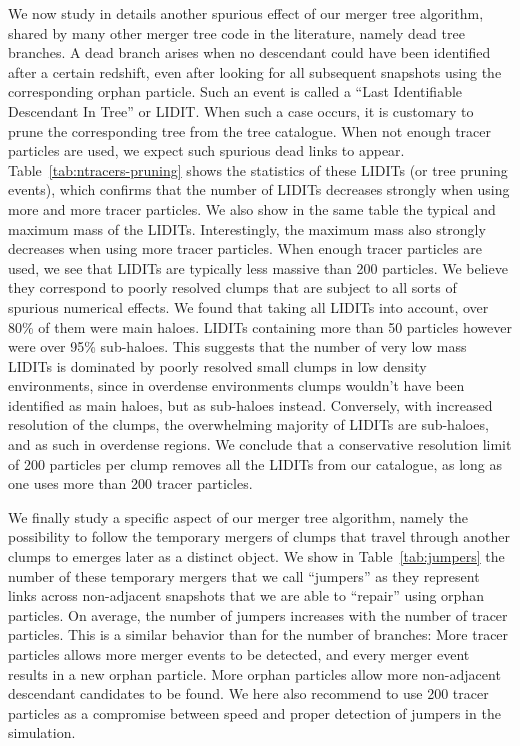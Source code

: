 We now study in details another spurious effect of our merger tree
algorithm, shared by many other merger tree code in the literature,
namely dead tree branches.  A dead branch arises when no descendant
could have been identified after a certain redshift, even after
looking for all subsequent snapshots using the corresponding orphan
particle. Such an event is called a ``Last Identifiable Descendant In
Tree'' or LIDIT.  When such a case occurs, it is customary to prune
the corresponding tree from the tree catalogue. When not enough tracer
particles are used, we expect such spurious dead links to
appear. Table~\ref{tab:ntracers-pruning} shows the statistics of these
LIDITs (or tree pruning events), which confirms that the number of
LIDITs decreases strongly when using more and more tracer
particles. We also show in the same table the typical and maximum mass
of the LIDITs. Interestingly, the maximum mass also strongly decreases
when using more tracer particles. When enough tracer particles are
used, we see that LIDITs are typically less massive than 200
particles. We believe they correspond to poorly resolved clumps that
are subject to all sorts of spurious numerical effects. We found that
taking all LIDITs into account, over 80\% of them were main haloes.
LIDITs containing more than 50 particles however were over 95\% sub-haloes.
This suggests that the number of very low mass LIDITs is dominated
by poorly resolved small clumps in low density environments, since
in overdense environments clumps wouldn't have been identified as main
haloes, but as sub-haloes instead. Conversely, with increased resolution
of the clumps, the overwhelming majority of LIDITs are sub-haloes, and as
such in overdense regions. We conclude that a
conservative resolution limit of 200 particles per clump removes all the
LIDITs from our catalogue, as long as one uses more than 200 tracer
particles.

We finally study a specific aspect of our merger tree algorithm,
namely the possibility to follow the temporary mergers of clumps that
travel through another clumps to emerges later as a distinct object.
We show in Table~\ref{tab:jumpers} the number of these temporary
mergers that we call ``jumpers'' as they represent links across
non-adjacent snapshots that we are able to ``repair'' using orphan
particles. On average, the number of jumpers increases with the
number of tracer particles. This is a similar behavior than for the
number of branches: More tracer particles allows more merger events to
be detected, and every merger event results in a new orphan particle.
More orphan particles allow more non-adjacent descendant candidates
to be found. We here also recommend to use 200 tracer particles as a
compromise between speed and proper detection of jumpers in the
simulation.

